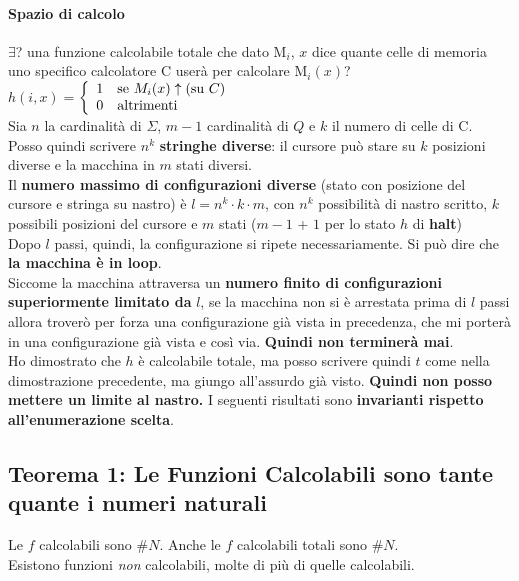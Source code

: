 \documentclass[10pt]{book}
\begin{document}
\paragraph{Spazio di calcolo} $\exists$? una funzione calcolabile totale che dato M$_i$, $x$ dice quante celle di memoria uno specifico calcolatore C userà per calcolare M$_i(x)$?\\
$h(i, x) = $\begin{math}
\left\{
\begin{array}{l l}
	1 & \text{se }M_i(x)\uparrow (\text{su }C)\\
	0 & \text{altrimenti}
\end{array}
\right.
\end{math}\\
Sia $n$ la cardinalità di $\Sigma$, $m - 1$ cardinalità di $Q$ e $k$ il numero di celle di C.\\
Posso quindi scrivere $n^k$ \textbf{stringhe diverse}: il cursore può stare su $k$ posizioni diverse e la macchina in $m$ stati diversi.\\
Il \textbf{numero massimo di configurazioni diverse} (stato con posizione del cursore e stringa su nastro) è  $l = n^k \cdot k \cdot m$, con $n^k$ possibilità di nastro scritto, $k$ possibili posizioni del cursore e $m$ stati ($m - 1$ + $1$ per lo stato $h$ di \textbf{halt})\\
Dopo $l$ passi, quindi, la configurazione si ripete necessariamente. Si può dire che \textbf{la macchina è in loop}.\\
Siccome la macchina attraversa un \textbf{numero finito di configurazioni superiormente limitato da} $l$, se la macchina non si è arrestata prima di $l$ passi allora troverò per forza una configurazione già vista in precedenza, che mi porterà in una configurazione già vista e così via. \textbf{Quindi non terminerà mai}.\\
Ho dimostrato che $h$ è calcolabile totale, ma posso scrivere quindi $t$ come nella dimostrazione precedente, ma giungo all'assurdo già visto. \textbf{Quindi non posso mettere un limite al nastro.}
\pagebreak
I seguenti risultati sono \textbf{invarianti rispetto all'enumerazione scelta}.
\subsection{Teorema 1: Le Funzioni Calcolabili sono tante quante i numeri naturali}
Le $f$ calcolabili sono \#$N$. Anche le $f$ calcolabili totali sono \#$N$.\\
Esistono funzioni \textit{non} calcolabili, molte di più di quelle calcolabili.
\end{document}
